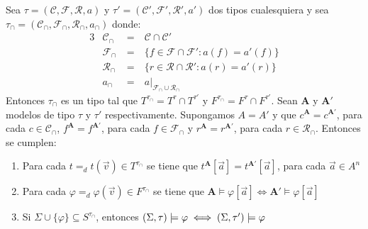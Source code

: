 \begin{lemma}
  Sea $\tau=(\mathcal{C},\mathcal{F},\mathcal{R},a)$ y $\tau'=(\mathcal{C}',\mathcal{F}',\mathcal{R}',a')$ dos tipos cualesquiera y sea $\tau_\cap=(\mathcal{C}_\cap,\mathcal{F}_\cap,\mathcal{R}_\cap,a_\cap)$ donde:
  \begin{alignat*}{3}
    &\mathcal{C}_\cap&\ =&\ \mathcal{C}\cap\mathcal{C}'\\
    &\mathcal{F}_\cap&\ =&\ \{f\in\mathcal{F}\cap\mathcal{F}':a(f)=a'(f)\}\\
    &\mathcal{R}_\cap&\ =&\ \{r\in\mathcal{R}\cap\mathcal{R}':a(r)=a'(r)\}\\
    &a_\cap&\ =&\ a|_{\mathcal{F}_\cap\cup\mathcal{R}_\cap}
  \end{alignat*}
  Entonces $\tau_\cap$ es un tipo tal que $T^{\tau_\cap}=T^\tau\cap T^{\tau'}$ y $F^{\tau_\cap}=F^\tau\cap F^{\tau'}$. Sean $\mathbf{A}$
  y $\mathbf{A'}$ modelos de tipo $\tau$ y $\tau'$ respectivamente. Supongamos $A=A'$ y que $c^\mathbf{A}=c^\mathbf{A'}$, para cada $c\in\mathcal{C}_\cap$,
  $f^\mathbf{A}=f^\mathbf{A'}$, para cada $f\in\mathcal{F}_\cap$ y $r^\mathbf{A}=r^\mathbf{A'}$, para cada $r\in\mathcal{R}_\cap$. Entonces se cumplen: \begin{enumerate}
    \item Para cada $t=_d t(\vec{v})\in T^{\tau_\cap}$ se tiene que $t^\mathbf{A}[\vec{a}]=t^\mathbf{A'}[\vec{a}]$, para cada $\vec{a}\in A^n$
    \item Para cada $\varphi =_d \varphi(\vec{v})\in F^{\tau_\cap}$ se tiene que $\mathbf{A}\models\varphi[\vec{a}]\iff\mathbf{A'}\models\varphi[\vec{a}]$
    \item Si $\Sigma\cup\{\varphi\}\subseteq S^{\tau_\cap}$, entonces $(\Sigma,\tau)\models\varphi\iff(\Sigma,\tau')\models\varphi$
  \end{enumerate}
\end{lemma}

\noproof

